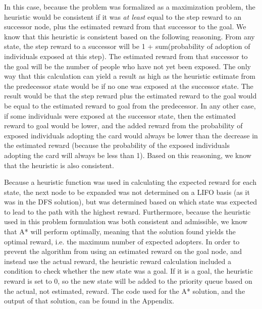 \documentclass[11pt,journal]{IEEEtran}
\begin{document}
In this case, because the problem was formalized as a maximization problem, the heuristic would be consistent if it was \textit{at least} equal to the step reward to an successor node, plus the estimated reward from that successor to the goal. We know that this heuristic is consistent based on the following reasoning. From any state, the step reward to a successor will be 1 + sum(probability of adoption of individuals exposed at this step). The estimated reward from that successor to the goal will be the number of people who have not yet been exposed. The only way that this calculation can yield a result as high as the heuristic estimate from the predecessor state would be if no one was exposed at the successor state. The result would be that the step reward plus the estimated reward to the goal would be equal to the estimated reward to goal from the predecessor. In any other case, if some individuals were exposed at the successor state, then the estimated reward to goal would be lower, and the added reward from the probability of exposed individuals adopting the card would always be lower than the decrease in the estimated reward (because the probability of the exposed individuals adopting the card will always be less than 1). Based on this reasoning, we know that the heuristic is also consistent.

Because a heuristic function was used in calculating the expected reward for each state, the next node to be expanded was not determined on a LIFO basis (as it was in the DFS solution), but was determined based on which state was expected to lead to the path with the highest reward. Furthermore, because the heuristic used in this problem formulation was both consistent and admissible, we know that A* will perform optimally, meaning that the solution found yields the optimal reward, i.e. the maximum number of expected adopters. In order to prevent the algorithm from using an estimated reward on the goal node, and instead use the actual reward, the heuristic reward calculation included a condition to check whether the new state was a goal. If it is a goal, the heuristic reward is set to 0, so the new state will be added to the priority queue based on the actual, not estimated, reward. The code used for the A* solution, and the output of that solution, can be found in the Appendix.
\end{document}

